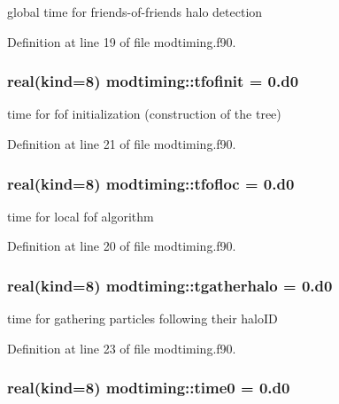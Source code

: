 global time for friends-\/of-\/friends halo detection 



Definition at line 19 of file modtiming.\-f90.

\hypertarget{classmodtiming_a2c5b98c383953b670ee94c1022c2d822}{
\subsubsection[{tfofinit}]{\setlength{\rightskip}{0pt plus 5cm}real(kind=8) modtiming\-::tfofinit = 0.d0}}\label{classmodtiming_a2c5b98c383953b670ee94c1022c2d822}


time for fof initialization (construction of the tree) 



Definition at line 21 of file modtiming.\-f90.

\hypertarget{classmodtiming_a2574a405aaa97058f43e1e6b0b1d96e1}{
\subsubsection[{tfofloc}]{\setlength{\rightskip}{0pt plus 5cm}real(kind=8) modtiming\-::tfofloc = 0.d0}}\label{classmodtiming_a2574a405aaa97058f43e1e6b0b1d96e1}


time for local fof algorithm 



Definition at line 20 of file modtiming.\-f90.

\hypertarget{classmodtiming_a6a20740b33d07d1c6b9ed51953b48b0d}{
\subsubsection[{tgatherhalo}]{\setlength{\rightskip}{0pt plus 5cm}real(kind=8) modtiming\-::tgatherhalo = 0.d0}}\label{classmodtiming_a6a20740b33d07d1c6b9ed51953b48b0d}


time for gathering particles following their halo\-I\-D 



Definition at line 23 of file modtiming.\-f90.

\hypertarget{classmodtiming_aa15cbf8a08e28c5209481b3ed5f11090}{
\subsubsection[{time0}]{\setlength{\rightskip}{0pt plus 5cm}real(kind=8) modtiming\-::time0 = 0.d0}}\label{classmodtiming_aa15cbf8a08e28c5209481b3ed5f11090}


